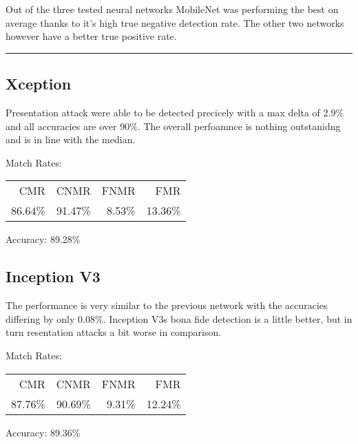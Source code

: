 \medskip\noindent


\bigskip\bigskip\noindent
Out of the three tested neural networks MobileNet was performing the best on average thanks to it's high true negative detection rate.
The other two networks however have a better true positive rate.
\bigskip\hrule\bigskip


\subsection{Xception}
\begin{minipage}[c]{0.7\textwidth}
    Presentation attack were able to be detected precicely with a max delta of 2.9\% and all accuracies are over 90\%.
    The overall perfoamnce is nothing outstanidng and is in line with the median.

    \medskip\noindent\centering Match Rates: 
    \begin{tabular}{ r  r  r  r |}
        CMR       & CNMR      & FNMR     & FMR     \\
        86.64\%   & 91.47\%   & 8.53\%   & 13.36\%  \\
    \end{tabular} \hspace{2mm} Accuracy: 89.28\%
\end{minipage}
\hfill
\begin{minipage}[c]{0.3\textwidth}
    \centering
    
\end{minipage}


\medskip\noindent


\bigskip
\subsection{Inception V3}
\begin{minipage}[c]{0.7\textwidth}

    The performance is very similar to the previous network with the accuracies differing by only 0.08\%.
    Inception V3s bona fide detection is a little better, but in turn resentation attacks a bit worse in comparison.

    \medskip\noindent\centering Match Rates: 
    \begin{tabular}{ r  r  r  r |}
        CMR       & CNMR      & FNMR     & FMR     \\
        87.76\%   & 90.69\%   & 9.31\%   & 12.24\%  \\
    \end{tabular} \hspace{2mm} Accuracy: 89.36\%

\end{minipage}
\hfill
\begin{minipage}[c]{0.3\textwidth}

    \centering
    

\end{minipage}



